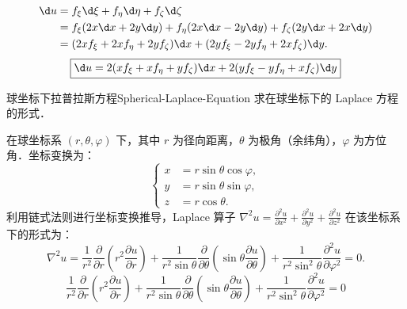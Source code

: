 \begin{solution}

    \begin{equation}
        \begin{aligned}
            \d u & = f_{\xi} \d \xi + f_{\eta} \d \eta + f_{\zeta} \d \zeta                                           \\
                 & = f_{\xi} (2x \d x + 2y \d y) + f_{\eta} (2x \d x - 2y \d y) + f_{\zeta} (2y \d x + 2x \d y)       \\
                 & = (2x f_{\xi} + 2x f_{\eta} + 2y f_{\zeta}) \d x + (2y f_{\xi} - 2y f_{\eta} + 2x f_{\zeta}) \d y.
        \end{aligned}
    \end{equation}
    \begin{equation}
        \boxed{\d u = 2(x f_{\xi} + x f_{\eta} + y f_{\zeta}) \d x + 2(y f_{\xi} - y f_{\eta} + x f_{\zeta}) \d y}
    \end{equation}
\end{solution}

\begin{problem}{球坐标下拉普拉斯方程}{Spherical-Laplace-Equation}
    求在球坐标下的 Laplace 方程的形式．
\end{problem}

\begin{solution}
    在球坐标系 $(r, \theta, \varphi)$ 下，其中 $r$ 为径向距离，$\theta$ 为极角（余纬角），$\varphi$ 为方位角．坐标变换为：
    \begin{equation}
        \left\{
        \begin{aligned}
            x & = r \sin \theta \cos \varphi, \\
            y & = r \sin \theta \sin \varphi, \\
            z & = r \cos \theta.
        \end{aligned}
        \right.
    \end{equation}
    利用链式法则进行坐标变换推导，Laplace 算子 $\nabla^2 u = \frac{\partial^2 u}{\partial x^2} + \frac{\partial^2 u}{\partial y^2} + \frac{\partial^2 u}{\partial z^2}$ 在该坐标系下的形式为：
    \begin{equation}
        \nabla^2 u = \frac{1}{r^2} \frac{\partial}{\partial r} \left( r^2 \frac{\partial u}{\partial r} \right) + \frac{1}{r^2 \sin \theta} \frac{\partial}{\partial \theta} \left( \sin \theta \frac{\partial u}{\partial \theta} \right) + \frac{1}{r^2 \sin^2 \theta} \frac{\partial^2 u}{\partial \varphi^2} = 0.
    \end{equation}
    \begin{equation}
        \boxed{\frac{1}{r^2} \frac{\partial}{\partial r} \left( r^2 \frac{\partial u}{\partial r} \right) + \frac{1}{r^2 \sin \theta} \frac{\partial}{\partial \theta} \left( \sin \theta \frac{\partial u}{\partial \theta} \right) + \frac{1}{r^2 \sin^2 \theta} \frac{\partial^2 u}{\partial \varphi^2} = 0}
    \end{equation}
\end{solution}

